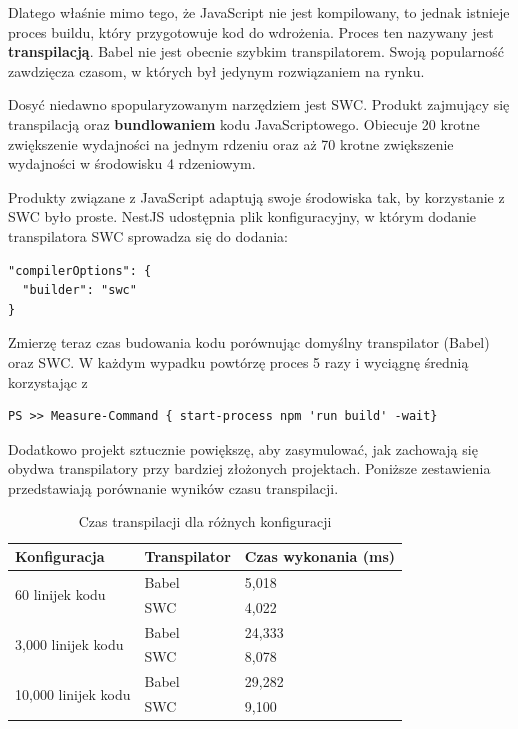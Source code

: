 \documentclass{article}
\begin{document}
Dlatego właśnie mimo tego, że JavaScript nie jest kompilowany, to jednak istnieje proces buildu, który przygotowuje kod do wdrożenia. Proces ten nazywany jest \textbf{transpilacją}. Babel nie jest obecnie szybkim transpilatorem. Swoją popularność zawdzięcza czasom, w których był jedynym rozwiązaniem na rynku.

Dosyć niedawno spopularyzowanym narzędziem jest SWC. Produkt zajmujący się transpilacją oraz \textbf{bundlowaniem} kodu JavaScriptowego. Obiecuje 20 krotne zwiększenie wydajności na jednym rdzeniu oraz aż 70 krotne zwiększenie wydajności w środowisku 4 rdzeniowym.

Produkty związane z JavaScript adaptują swoje środowiska tak, by korzystanie z SWC było proste. NestJS udostępnia plik konfiguracyjny, w którym dodanie transpilatora SWC sprowadza się do dodania:

\begin{lstlisting}[caption=Fragment pliku konfiguracyjnego nest-cli.json]
"compilerOptions": {
  "builder": "swc"
}
\end{lstlisting}

Zmierzę teraz czas budowania kodu porównując domyślny transpilator (Babel) oraz SWC. W każdym wypadku powtórzę proces 5 razy i wyciągnę średnią korzystając z
\begin{lstlisting}[caption=Komenda mierząca czas wykonania komendy w systemie Windows]
PS >> Measure-Command { start-process npm 'run build' -wait}
\end{lstlisting}


Dodatkowo projekt sztucznie powiększę, aby zasymulować, jak zachowają się obydwa transpilatory przy bardziej złożonych projektach. Poniższe zestawienia przedstawiają porównanie wyników czasu transpilacji.

\begin{table}[H]
\centering
\begin{tabular}{|l|l|l|}
\hline
\textbf{Konfiguracja} & \textbf{Transpilator} & \textbf{Czas wykonania (ms)} \\ \hline
\multirow{2}{*}{60 linijek kodu} & Babel & 5,018 \\ 
& SWC & 4,022 \\ \hline
\multirow{2}{*}{3,000 linijek kodu} & Babel & 24,333 \\ 
& SWC & 8,078 \\ \hline
\multirow{2}{*}{10,000 linijek kodu} & Babel & 29,282 \\ 
& SWC & 9,100 \\ \hline
\end{tabular}
\caption{Czas transpilacji dla różnych konfiguracji}
\label{tab:czas_wykonania}
\end{table}
\end{document}
